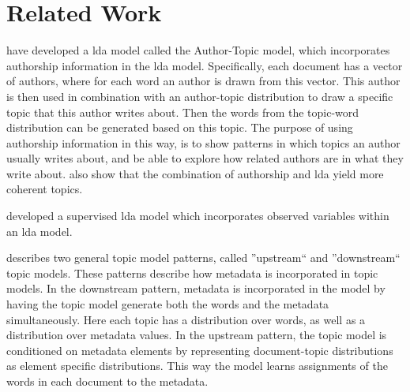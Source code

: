 \section{Related Work}

\citet{author_topic_2012} have developed a \gls{lda} model called the Author-Topic model, which incorporates authorship information in the \gls{lda} model.
Specifically, each document has a vector of authors, where for each word an author is drawn from this vector.
This author is then used in combination with an author-topic distribution to draw a specific topic that this author writes about.
Then the words from the topic-word distribution can be generated based on this topic.
The purpose of using authorship information in this way, is to show patterns in which topics an author usually writes about, and be able to explore how related authors are in what they write about.
\citeauthor{author_topic_2012} also show that the combination of authorship and \gls{lda} yield more coherent topics.


\citet{blei2010supervised} developed a supervised \gls{lda} model which incorporates observed variables within an \gls{lda} model.


\citet{mimno2008topic} describes two general topic model patterns, called ''upstream`` and ''downstream`` topic models.
These patterns describe how metadata is incorporated in topic models.
In the downstream pattern, metadata is incorporated in the model by having the topic model generate both the words and the metadata simultaneously.
Here each topic has a distribution over words, as well as a distribution over metadata values.
In the upstream pattern, the topic model is conditioned on metadata elements by representing document-topic distributions as element specific distributions.
This way the model learns assignments of the words in each document to the metadata.

